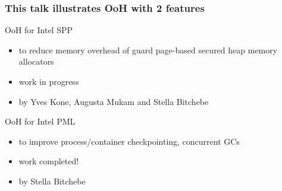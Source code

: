 \documentclass[xcolor=table,bigger,unknownkeysallowed]{beamer}
\begin{document}
        \begin{frame}
        \frametitle{This talk illustrates OoH with 2 features} 
			\begin{block}{OoH for Intel SPP}
				\begin{itemize}
					\item to reduce memory overhead of guard page-based secured heap memory allocators
					\item work in progress
					\item by Yves Kone, Augusta Mukam and Stella Bitchebe
				\end{itemize}
			\end{block}
			\begin{block}{OoH for Intel PML}
				\begin{itemize}
					\item to improve process/container checkpointing, concurrent GCs
					\item work completed!
					\item by Stella Bitchebe
				\end{itemize}
			\end{block}				
        \end{frame}
\end{document}
